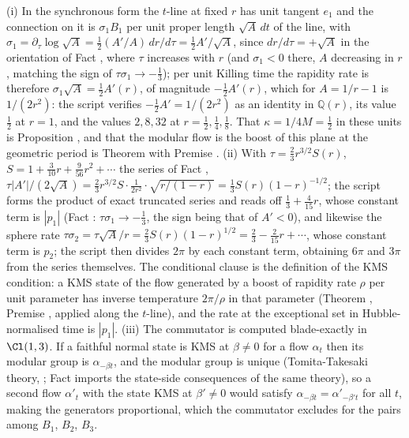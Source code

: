 (i) In the synchronous form the $t$-line at fixed $r$ has unit tangent $e_1$ and the connection on it is $\sigma_1 B_1$ per unit proper length $\sqrt{A}\,dt$ of the line, with $\sigma_1 = \partial_\tau\log\sqrt A = \tfrac12 (A'/A)\,dr/d\tau = \tfrac12 A'/\sqrt{A}$, since $dr/d\tau = +\sqrt A$ in the orientation of Fact , where $\tau$ increases with $r$ (and $\sigma_1 < 0$ there, $A$ decreasing in $r$, matching the sign of $\tau\sigma_1 \to -\tfrac13$); per unit Killing time the rapidity rate is therefore $\sigma_1\sqrt A = \tfrac12 A'(r)$, of magnitude $-\tfrac12 A'(r)$, which for $A = 1/r - 1$ is $1/(2r^2)$: the script verifies $-\tfrac12 A' = 1/(2r^2)$ as an identity in $\mathbb{Q}(r)$, its value $\tfrac12$ at $r = 1$, and the values $2, 8, 32$ at $r = \tfrac12, \tfrac14, \tfrac18$. That $\kappa = 1/4M = \tfrac12$ in these units is Proposition , and that the modular flow is the boost of this plane at the geometric period is Theorem  with Premise . (ii) With $\tau = \tfrac23 r^{3/2} S(r)$, $S = 1 + \tfrac{3}{10}r + \tfrac{9}{56}r^2 + \cdots$ the series of Fact , $\tau |A'|/(2\sqrt A) = \tfrac23 r^{3/2} S \cdot \tfrac{1}{2r^2} \cdot \sqrt{r/(1-r)} = \tfrac13 S(r)(1 - r)^{-1/2}$; the script forms the product of exact truncated series and reads off $\tfrac13 + \tfrac{4}{15}r$, whose constant term is $|p_1|$ (Fact : $\tau\sigma_1 \to -\tfrac13$, the sign being that of $A' < 0$), and likewise the sphere rate $\tau\sigma_2 = \tau\sqrt{A}/r = \tfrac23 S(r)(1 - r)^{1/2} = \tfrac23 - \tfrac{2}{15}r + \cdots$, whose constant term is $p_2$; the script then divides $2\pi$ by each constant term, obtaining $6\pi$ and $3\pi$ from the series themselves. The conditional clause is the definition of the KMS condition: a KMS state of the flow generated by a boost of rapidity rate $\rho$ per unit parameter has inverse temperature $2\pi/\rho$ in that parameter (Theorem , Premise , applied along the $t$-line), and the rate at the exceptional set in Hubble-normalised time is $|p_1|$. (iii) The commutator is computed blade-exactly in $\Cl(1,3)$. If a faithful normal state is KMS at $\beta \neq 0$ for a flow $\alpha_t$ then its modular group is $\alpha_{-\beta t}$, and the modular group is unique (Tomita-Takesaki theory, \cite[Sec.~5.3]{BR2}; Fact  imports the state-side consequences of the same theory), so a second flow $\alpha'_t$ with the state KMS at $\beta' \neq 0$ would satisfy $\alpha_{-\beta t} = \alpha'_{-\beta' t}$ for all $t$, making the generators proportional, which the commutator excludes for the pairs among $B_1$, $B_2$, $B_3$.

